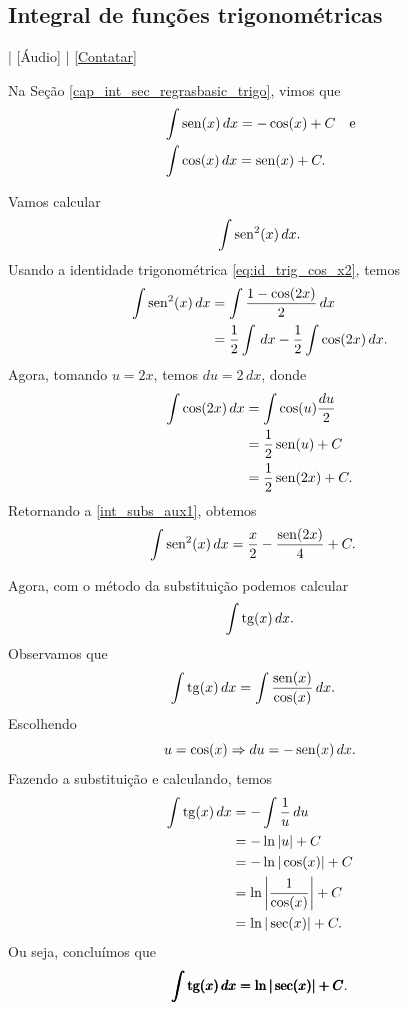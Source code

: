 \subsection{Integral de funções trigonométricas}

\begin{flushright}
  [Vídeo] | [Áudio] | \href{https://phkonzen.github.io/notas/contato.html}{[Contatar]}
\end{flushright}

Na Seção \ref{cap_int_sec_regrasbasic_trigo}, vimos que
\begin{align}
  &\int \operatorname{sen}(x)\,dx = -\cos(x) + C \quad\text{e}\\
  &\int \cos(x)\,dx = \operatorname{sen}(x) + C.
\end{align}

\begin{ex}
  Vamos calcular
  \begin{equation}
    \int \operatorname{sen}^2(x)\,dx.
  \end{equation}
  Usando a identidade trigonométrica \ref{eq:id_trig_cos_x2}, temos
  \begin{align}
    \int \operatorname{sen}^2(x)\,dx &= \int \frac{1-\cos(2x)}{2}\,dx \\
                       &= \frac{1}{2}\int\,dx - \frac{1}{2}\int\cos(2x)\,dx.\label{int_subs_aux1}
  \end{align}
  Agora, tomando $u = 2x$, temos $du = 2\,dx$, donde
  \begin{align}
    \int \cos(2x)\,dx &= \int\cos(u)\frac{du}{2} \\
                      &= \frac{1}{2}\operatorname{sen}(u) + C \\
                      &= \frac{1}{2}\operatorname{sen}(2x) + C.
  \end{align}
  Retornando a \ref{int_subs_aux1}, obtemos
  \begin{align}
    \int \operatorname{sen}^2(x)\,dx &= \frac{x}{2} - \frac{\operatorname{sen}(2x)}{4} + C.
  \end{align}
\end{ex}

Agora, com o método da substituição podemos calcular
\begin{equation}
  \int \operatorname{tg}(x)\,dx.
\end{equation}
Observamos que
\begin{align}
  \int \operatorname{tg}(x)\,dx &= \int \frac{\operatorname{sen}(x)}{\cos(x)}\,dx.
\end{align}
Escolhendo
\begin{equation}
  u = \cos(x) \Rightarrow du = -\operatorname{sen}(x)\,dx.
\end{equation}
Fazendo a substituição e calculando, temos
\begin{align}
  \int \operatorname{tg}(x)\,dx &= -\int \frac{1}{u}\,du \\
                  &= -\ln|u| + C \\
                  &= -\ln|\cos(x)| + C \\
                  &= \ln\left|\frac{1}{\cos(x)}\right| + C\\
                  &= \ln|\sec(x)| + C.
\end{align}
Ou seja, concluímos que
\begin{equation}
  \pmb{\int\operatorname{tg}(x)\,dx = \ln|\sec(x)| + C}.
\end{equation}

